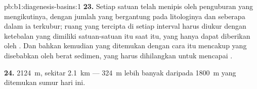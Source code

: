 \begin{solution}{pb:b1:diagenesis-basins:1}
\textbf{23.} Setiap satuan telah menipis oleh penguburan yang mengikutinya, dengan jumlah
yang bergantung pada litologinya dan seberapa dalam ia terkubur; ruang yang tercipta di
setiap interval harus diukur dengan ketebalan yang dimiliki satuan-satuan itu saat itu,
yang hanya dapat diberikan oleh . Dan bahkan kemudian  yang ditemukan
dengan cara itu mencakup  yang disebabkan oleh berat sedimen, yang harus
dihilangkan untuk mencapai .

\textbf{24.} \qty{2124}{m}, sekitar \qty{2.1}{km} --- \qty{324}{m} lebih banyak daripada
\qty{1800}{m} yang ditemukan sumur hari ini.
\end{solution}
